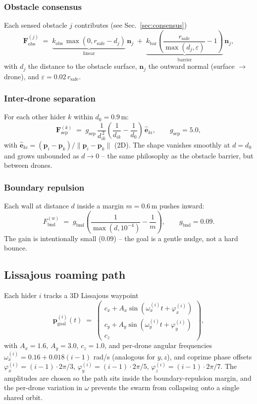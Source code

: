 \documentclass[11pt,a4paper]{article}
\newcommand{\vect}[1]{\mathbf{#1}}
\begin{document}
\subsubsection*{Obstacle consensus}
Each sensed obstacle $j$ contributes (see Sec.~\ref{sec:consensus})
\[
    \vect{F}^{(j)}_\mathrm{obs} \;=\;
    \underbrace{k_\mathrm{obs}\,\max(0, r_\mathrm{safe} - d_j)}_{\text{linear}}
    \,\vect{n}_j
    \;+\;
    \underbrace{k_\mathrm{bar}\!\left(\frac{r_\mathrm{safe}}{\max(d_j,\varepsilon)} - 1\right)}_{\text{barrier}}
    \,\vect{n}_j,
\]
with $d_j$ the distance to the obstacle surface, $\vect{n}_j$ the outward
normal (surface $\to$ drone), and $\varepsilon = 0.02\,r_\mathrm{safe}$.

\subsubsection*{Inter-drone separation}
For each other hider $k$ within $d_0 = 0.9\,\text{m}$:
\[
    \vect{F}^{(k)}_\mathrm{sep} \;=\;
    g_\mathrm{sep}\,
    \frac{1}{d_{ik}^{\,2}}
    \!\left(\frac{1}{d_{ik}} - \frac{1}{d_0}\right)
    \,\hat{\vect{e}}_{ki},
    \qquad g_\mathrm{sep} = 5.0,
\]
with $\hat{\vect{e}}_{ki} = (\vect{p}_i - \vect{p}_k)/\|\vect{p}_i - \vect{p}_k\|$
(2D). The shape vanishes smoothly at $d = d_0$ and grows unbounded as $d \to 0$
-- the same philosophy as the obstacle barrier, but between drones.

\subsubsection*{Boundary repulsion}
Each wall at distance $d$ inside a margin $m = 0.6\,\text{m}$ pushes inward:
\[
    F_\mathrm{bnd}^{(w)} \;=\;
    g_\mathrm{bnd}\!\left(\frac{1}{\max(d,10^{-4})} - \frac{1}{m}\right),
    \qquad g_\mathrm{bnd} = 0.09.
\]
The gain is intentionally small ($0.09$) -- the goal is a gentle nudge, not a
hard bounce.

\subsection{Lissajous roaming path}
\label{sec:lissajous}

Each hider $i$ tracks a 3D Lissajous waypoint
\[
    \vect{p}_\mathrm{goal}^{(i)}(t)
    \;=\;
    \begin{pmatrix}
        c_x + A_x \sin(\omega_x^{(i)} t + \varphi_x^{(i)}) \\
        c_y + A_y \sin(\omega_y^{(i)} t + \varphi_y^{(i)}) \\
        c_z
    \end{pmatrix},
\]
with $A_x = 1.6$, $A_y = 3.0$, $c_z = 1.0$, and per-drone angular frequencies
$\omega_x^{(i)} = 0.16 + 0.018(i-1)$ rad/s (analogous for $y, z$), and coprime
phase offsets $\varphi^{(i)}_x = (i-1)\cdot 2\pi/3$, $\varphi^{(i)}_y = (i-1)\cdot 2\pi/5$,
$\varphi^{(i)}_z = (i-1)\cdot 2\pi/7$. The amplitudes are chosen so the path
sits inside the boundary-repulsion margin, and the per-drone variation in
$\omega$ prevents the swarm from collapsing onto a single shared orbit.
\end{document}
